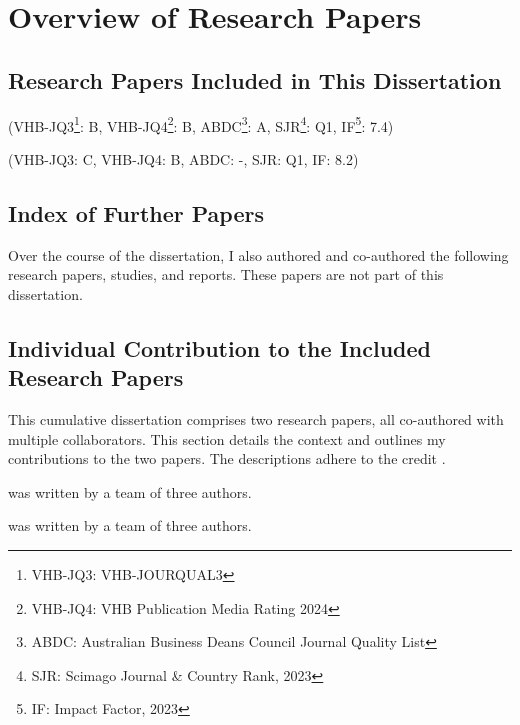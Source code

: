 \appendix

\chapter{Overview of Research Papers}
\label{cha:app}

\section{Research Papers Included in This Dissertation}
\label{sec:app_papers}

(VHB-JQ3\footnote{VHB-JQ3: VHB-JOURQUAL3}: B, 
VHB-JQ4\footnote{VHB-JQ4: VHB Publication Media Rating 2024}: B,
ABDC\footnote{ABDC: Australian Business Deans Council Journal Quality List}: A, 
SJR\footnote{SJR: Scimago Journal \& Country Rank, 2023}: Q1, 
IF\footnote{IF: Impact Factor, 2023}: 7.4)

(VHB-JQ3: C, 
VHB-JQ4: B,
ABDC: -, 
SJR: Q1, 
IF: 8.2)



\section{Index of Further Papers}
\label{app:sec:further}

Over the course of the dissertation, I also authored and co-authored the following research papers, studies, and reports.
These papers are not part of this dissertation.



\section{Individual Contribution to the Included Research Papers}
\label{sec:contributions}
    

This cumulative dissertation comprises two research papers, all co-authored with multiple collaborators. 
This section details the context and outlines my contributions to the two papers. 
The descriptions adhere to the \ac{credit} \citep{allen_2019_HowCan}.

 was written by a team of three authors. 

 was written by a team of three authors. 
